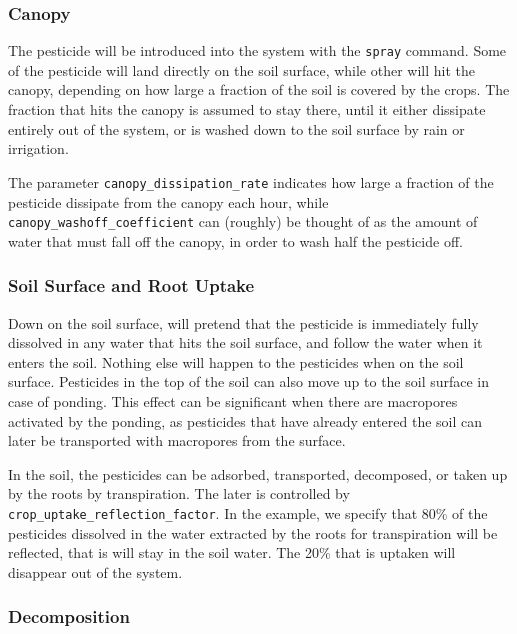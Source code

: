 \documentclass[a4paper,11pt]{article}
\begin{document}
\subsubsection{Canopy}

The pesticide will be introduced into the system with the
\texttt{spray} command.  Some of the pesticide will land directly on
the soil surface, while other will hit the canopy, depending on how
large a fraction of the soil is covered by the crops.  The fraction
that hits the canopy is assumed to stay there, until it either
dissipate entirely out of the system, or is washed down to the soil
surface by rain or irrigation.  

The parameter \texttt{canopy\_dissipation\_rate} indicates how large a
fraction of the pesticide dissipate from the canopy each hour, while
\texttt{canopy\_washoff\_coefficient} can (roughly) be thought of as
the amount of water that must fall off the canopy, in order to wash
half the pesticide off.

\subsubsection{Soil Surface and Root Uptake}

Down on the soil surface, \daisy{} will pretend that the pesticide is
immediately fully dissolved in any water that hits the soil surface,
and follow the water when it enters the soil.  Nothing else will
happen to the pesticides when on the soil surface.  Pesticides in the
top of the soil can also move up to the soil surface in case of
ponding.  This effect can be significant when there are macropores
activated by the ponding, as pesticides that have already entered the
soil can later be transported with macropores from the surface.

In the soil, the pesticides can be adsorbed, transported, decomposed,
or taken up by the roots by transpiration.  The later is controlled by
\linebreak{}\texttt{crop\_uptake\_reflection\_factor}.  In the
example, we specify that 80\% of the pesticides dissolved in the water
extracted by the roots for transpiration will be reflected, that is
will stay in the soil water.  The 20\% that is uptaken will disappear
out of the system.

\subsubsection{Decomposition}
\end{document}
